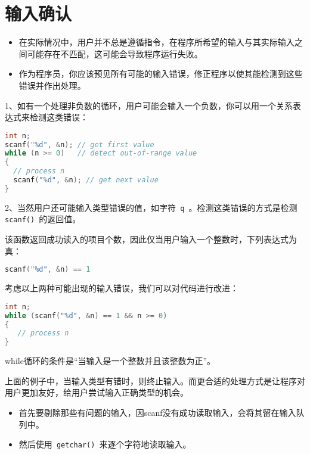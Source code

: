 \section{输入确认}
\begin{frame}[fragile]\ft{\secname}
\begin{itemize}
\item
在实际情况中，用户并不总是遵循指令，在程序所希望的输入与其实际输入之间可能存在不匹配，这可能会导致程序运行失败。\\[0.1in]
\item
作为程序员，你应该预见所有可能的输入错误，修正程序以使其能检测到这些错误并作出处理。

\end{itemize}
\end{frame}

\begin{frame}[fragile]\ft{\secname}
1、如有一个处理非负数的循环，用户可能会输入一个负数，你可以用一个关系表达式来检测这类错误：
\begin{lstlisting}[language=c]
int n;
scanf("%d", &n); // get first value
while (n >= 0)   // detect out-of-range value
{
  // process n
  scanf("%d", &n); // get next value
}
\end{lstlisting}
\end{frame}

\begin{frame}[fragile]\ft{\secname}
2、当然用户还可能输入类型错误的值，如字符\lstinline| q |。检测这类错误的方式是检测\lstinline| scanf() |的返回值。 \vspace{0.1in}

该函数返回成功读入的项目个数，因此仅当用户输入一个整数时，下列表达式为真：
\begin{lstlisting}[language=c]
scanf("%d", &n) == 1
\end{lstlisting}
\end{frame}

\begin{frame}[fragile]\ft{\secname}
考虑以上两种可能出现的输入错误，我们可以对代码进行改进：
\begin{lstlisting}[language=c]
int n;
while (scanf("%d", &n) == 1 && n >= 0) 
{
   // process n 
}
\end{lstlisting}
{\tf while}循环的条件是“当输入是一个整数并且该整数为正”。
\end{frame}

\begin{frame}[fragile]\ft{\secname}
上面的例子中，当输入类型有错时，则终止输入。而更合适的处理方式是让程序对用户更加友好，给用户尝试输入正确类型的机会。\vspace{.1in}

\begin{itemize}
\item 首先要剔除那些有问题的输入，因scanf没有成功读取输入，会将其留在输入队列中。\\[0.1in]
\item 然后使用\lstinline| getchar() |来逐个字符地读取输入。
\end{itemize}

\end{frame}

